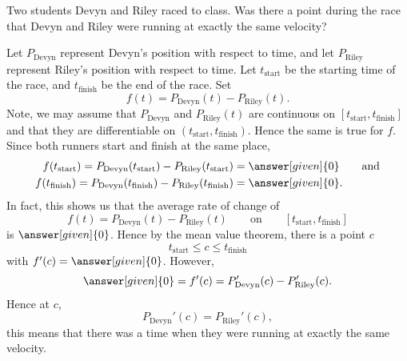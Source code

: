 \documentclass{ximera}
\begin{document}
\begin{example}
  Two students Devyn and Riley raced to class. Was there a point
  during the race that Devyn and Riley were running at exactly the
  same velocity?
  \begin{explanation}
    Let $P_\mathrm{Devyn}$ represent Devyn's position with respect to
    time, and let $P_\mathrm{Riley}$ represent Riley's position with
    respect to time. Let $t_\mathrm{start}$ be the starting time of
    the race, and $t_\mathrm{finish}$ be the end of the race. Set
    \[
    f(t) =P_\mathrm{Devyn}(t)-P_\mathrm{Riley}(t).
    \]
    Note, we may assume that $P_\mathrm{Devyn}$ and
    $P_\mathrm{Riley}(t)$ are continuous on
    $[t_\mathrm{start},t_\mathrm{finish}]$ and that they are
    differentiable on $(t_\mathrm{start},t_\mathrm{finish})$. Hence
    the same is true for $f$. Since both runners start and finish at
    the same place,
    \begin{align*}
    f(t_\mathrm{start}) = P_\mathrm{Devyn}(t_\mathrm{start})-P_\mathrm{Riley}(t_\mathrm{start}) &= \answer[given]{0}\qquad\text{and}\\
    f(t_\mathrm{finish})=P_\mathrm{Devyn}(t_\mathrm{finish})-P_\mathrm{Riley}(t_\mathrm{finish}) &= \answer[given]{0}.\\
    \end{align*}
    In fact, this shows us that the average rate of change of
    \[
    f(t) = P_\mathrm{Devyn}(t)-P_\mathrm{Riley}(t)
    \qquad\text{on}\qquad [t_\mathrm{start},t_\mathrm{finish}]
    \]
    is $\answer[given]{0}$. Hence by the mean value theorem, there is a point $c$
    \[
    t_\mathrm{start}\le c \le t_{\mathrm{finish}}
    \]
    with $f'(c) = \answer[given]{0}$. However,
    \[
    \answer[given]{0} = f'(c) = P_\mathrm{Devyn}'(c)-P_\mathrm{Riley}'(c).
    \]
    Hence at $c$,
    \[
    P_\mathrm{Devyn}'(c)=P_\mathrm{Riley}'(c),
    \]
    this means that there was a time when they were running at exactly the same velocity. 
  \end{explanation}
\end{example}
\end{document}

